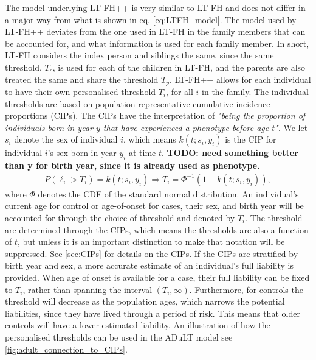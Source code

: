 The model underlying LT-FH++ is very similar to LT-FH and does not differ in a major way from what is shown in eq. \ref{eq:LTFH_model}. The model used by LT-FH++ deviates from the one used in LT-FH in the family members that can be accounted for, and what information is used for each family member. In short, LT-FH considers the index person and siblings the same, since the same threshold, $ T_c $, is used for each of the children in LT-FH, and the parents are also treated the same and share the threshold $ T_p $. LT-FH++ allows for each individual to have their own personalised threshold $ T_i $, for all $ i $ in the family. The individual thresholds are based on population representative cumulative incidence proportions (CIPs). The CIPs have the interpretation of \textit{"being the proportion of individuals born in year $ y $ that have experienced a phenotype before age $ t $"}. We let $ s_i $ denote the sex of individual $ i $, which means $ k(t; s_i, y_i) $ is the CIP for individual $ i $'s sex born in year $ y_i $ at time $ t $.
\textbf{TODO: need something better than y for birth year, since it is already used as phenotype.}
\begin{align*}
P\left( \ell_i > T_i \right) = k(t; s_i, y_i) \Rightarrow T_i = \Phi^{-1} \left(1 - k(t; s_i, y_i) \right),
\end{align*}
where $ \Phi $ denotes the CDF of the standard normal distribution. An individual's current age for control or age-of-onset for cases, their sex, and birth year will be accounted for through the choice of threshold and denoted by $ T_i $. The threshold are determined through the CIPs, which means the thresholds are also a function of $ t $, but unless it is an important distinction to make that notation will be suppressed. See \cref{sec:CIPs} for details on the CIPs. If the CIPs are stratified by birth year and sex, a more accurate estimate of an individual's full liability is provided. When age of onset is available for a case, their full liability can be fixed to $ T_i $, rather than spanning the interval $ (T_i, \infty) $. Furthermore, for controls the threshold will decrease as the population ages, which narrows the potential liabilities, since they have lived through a period of risk. This means that older controls will have a lower estimated liability. An illustration of how the personalised thresholds can be used in the ADuLT model see \cref{fig:adult_connection_to_CIPs}.

